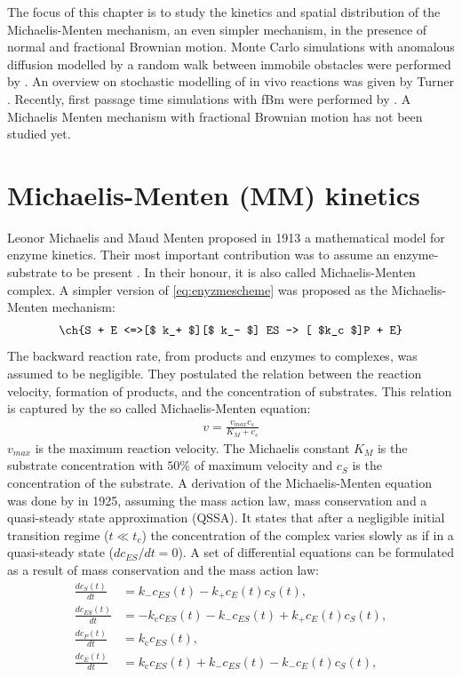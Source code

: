 \documentclass[
  a4paper,BCOR10mm,oneside,
  headsepline,footsepline,%
  fleqn,openbib
]{scrbook}
\begin{document}
The focus of this chapter is to study the kinetics and spatial distribution of the Michaelis-Menten mechanism, an even simpler mechanism, in the presence of normal and fractional Brownian motion. Monte Carlo simulations with anomalous diffusion modelled by a random walk between immobile obstacles were performed by \citet{Berry2002, Schnell2004}. An overview on stochastic modelling of in vivo reactions was given by Turner \cite{Turner2004}. Recently, first passage time simulations with fBm were performed by \citet{Jeon2014}. A Michaelis Menten mechanism with fractional Brownian motion has not been studied yet.
\section{Michaelis-Menten (MM) kinetics}
Leonor Michaelis and Maud Menten  proposed in 1913 a mathematical model for enzyme kinetics. Their most important contribution was to assume an enzyme-substrate to be present \cite{michaelis1913kinetik}. In their honour, it is also called Michaelis-Menten complex. A simpler version of \cref{eq:enyzmescheme} was proposed as the Michaelis-Menten mechanism:
\begin{align} \label{eq:michaelismechanism}
\ch{S + E <=>[$ k_+ $][$ k_- $] ES -> [ $k_c $]P + E}
\end{align}
 The backward reaction rate, from products and enzymes to complexes, was assumed to be negligible. They postulated the relation between the reaction velocity, formation of products, and the concentration of substrates. This relation is captured by the so called Michaelis-Menten equation:
\begin{align} \label{michaelis-menten-equation}
 v=\frac{v_{max} c_s}{K_M+ c_s}
\end{align}
$v_{max}$ is the maximum reaction velocity. The Michaelis constant $K_M$ is the substrate concentration with $50 \%$ of maximum velocity and $c_S$  is the concentration of the substrate. A derivation of the Michaelis-Menten equation was done by \citet{Briggs1925} in 1925, assuming the mass action law, mass conservation and a quasi-steady state approximation (QSSA). It states that after a negligible initial transition regime ($t \ll t_c$) the concentration of the complex varies slowly as if in a quasi-steady state ($dc_{ES}/dt=0$). A set of differential equations can be formulated as a result of mass conservation and the mass action law:
\begin{align}
\frac{dc_S(t)}{dt} &= k_{\mathrm{-}} c_{ES}(t)-k_{\mathrm{+}} c_E(t) c_S(t),\\
\frac{dc_{ES}(t)}{dt} &=  - k_{\mathrm{c}} c_{ES}(t) -k_{\mathrm{-}} c_{ES}(t)+k_{\mathrm{+}} c_E(t) c_S(t), \label{quasisteadymichaelis} \\
\frac{dc_P(t)}{dt} &= k_{\mathrm{c}} c_{ES}(t)  \label{first}, \\
\frac{dc_E(t)}{dt} &= k_{\mathrm{c}} c_{ES}(t)+k_{\mathrm{-}} c_{ES}(t)-k_{\mathrm{-}} c_E(t) c_S(t),
\end{align}
\end{document}
